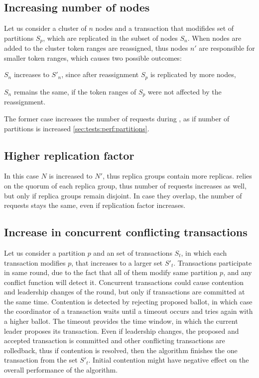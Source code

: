 \subsection{Increasing number of nodes}
Let us consider a cluster of $n$ nodes and a transaction that modifides set of partitions $S_{p}$, which are replicated in the subset of nodes $S_{n}$.
When nodes are added to the cluster token ranges are reassigned, thus nodes $n'$ are responsible for smaller token ranges, which causes two possible outcomes:
\begin{enumerate*}
\item $S_{n}$ increases to $S'_{n}$, since after reassignment $S_{p}$ is replicated by more nodes,
\item $S_{n}$ remains the same, if the token ranges of $S_{p}$ were not affected by the reassignment.
\end{enumerate*}

The former case increases the number of requests during \mpt, as if number of partitions is increased \ref{sec:tests:perf:partitions}.

\subsection{Higher replication factor}
In this case $N$ is increased to $N'$, thus replica groups contain more replicas. \mpt relies on the quorum of each replica group, thus number of requests increases as well, but only if replica groups remain disjoint. In case they overlap, the number of requests stays the same, even if replication factor increases.

\subsection{Increase in concurrent conflicting transactions}
Let us consider a partition $p$ and an set of transactions $S_{t}$, in which each transaction modifies $p$, that increases to a larger set $S'_{t}$. 
Transactions participate in same \paxos round, due to the fact that all of them modify same partition $p$, and any conflict function \label{sec:theory:conflictFunctions} will detect it.
Concurrent transactions could cause contention and leadership changes of the \paxos round, but only if transactions are committed at the same time. Contention is detected by rejecting proposed ballot, in which case the coordinator of a transaction waits until a timeout occurs and tries again with a higher ballot. The timeout provides the time window, in which the current leader proposes its transaction. Even if leadership changes, the proposed and accepted transaction is committed and other conflicting transactions are rolledback, thus if contention is resolved, then the algorithm finishes the one transaction from the set $S'_{t}$. Initial contention might have negative effect on the overall performance of the algorithm.

